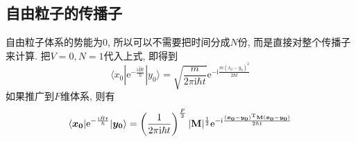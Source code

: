         \subsection{自由粒子的传播子}

        自由粒子体系的势能为0, 所以可以不需要把时间分成$N$份, 而是直接对整个传播子来计算. 把$V=0,N=1$代入上式, 即得到
        \begin{equation}\label{eq:8-2-2}
            \langle x_0 | \mathrm{e}^{-\frac {\mathrm{i}\hat{H}t}{\hbar}} | y_0 \rangle = \sqrt{\frac {m}{2\pi\mathrm{i} \hbar t}} \mathrm{e}^{-\mathrm{i}\frac {m(x_0 - y_0)^2}{2\hbar t}}
        \end{equation}
        如果推广到$F$维体系, 则有
        \begin{equation}
            \langle \bm{x_0} | \mathrm{e}^{-\frac {\mathrm{i}\hat{H}t}{\hbar}} |\bm{y_0} \rangle = \left(\frac {1}{2\pi\mathrm{i} \hbar t} \right)^{\frac F2} |\mathbf{M}|^{\frac 12} \mathrm{e}^{-\mathrm{i}\frac {(\bm{x_0}-\bm{y_0})^{\mathrm{T}} \mathbf{M} (\bm{x_0}-\bm{y_0})}{2\hbar t}}
        \end{equation}

        \splitline

